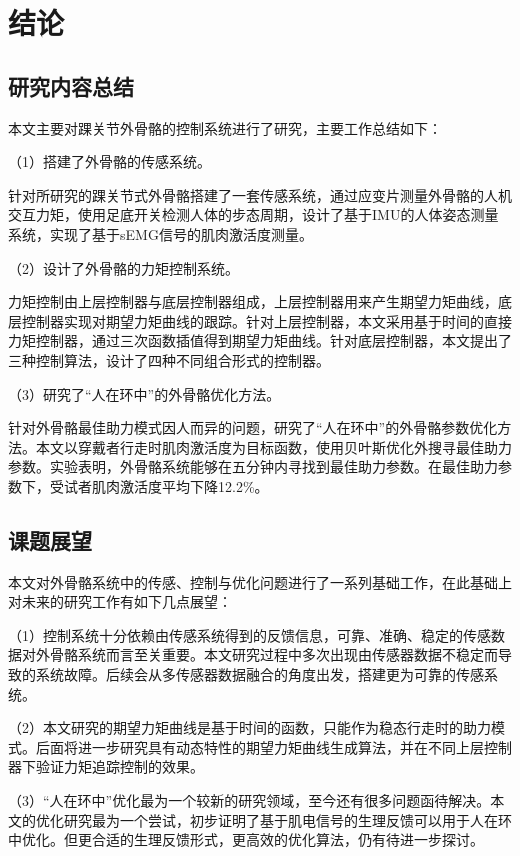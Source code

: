\chapter{结论}
\section{研究内容总结}

本文主要对踝关节外骨骼的控制系统进行了研究，主要工作总结如下：

（1）搭建了外骨骼的传感系统。

针对所研究的踝关节式外骨骼搭建了一套传感系统，通过应变片测量外骨骼的人机交互力矩，使用足底开关检测人体的步态周期，设计了基于IMU的人体姿态测量系统，实现了基于sEMG信号的肌肉激活度测量。

（2）设计了外骨骼的力矩控制系统。

力矩控制由上层控制器与底层控制器组成，上层控制器用来产生期望力矩曲线，底层控制器实现对期望力矩曲线的跟踪。针对上层控制器，本文采用基于时间的直接力矩控制器，通过三次函数插值得到期望力矩曲线。针对底层控制器，本文提出了三种控制算法，设计了四种不同组合形式的控制器。

（3）研究了“人在环中”的外骨骼优化方法。

针对外骨骼最佳助力模式因人而异的问题，研究了“人在环中”的外骨骼参数优化方法。本文以穿戴者行走时肌肉激活度为目标函数，使用贝叶斯优化外搜寻最佳助力参数。实验表明，外骨骼系统能够在五分钟内寻找到最佳助力参数。在最佳助力参数下，受试者肌肉激活度平均下降12.2\%。

\section{课题展望}

本文对外骨骼系统中的传感、控制与优化问题进行了一系列基础工作，在此基础上对未来的研究工作有如下几点展望：

（1）控制系统十分依赖由传感系统得到的反馈信息，可靠、准确、稳定的传感数据对外骨骼系统而言至关重要。本文研究过程中多次出现由传感器数据不稳定而导致的系统故障。后续会从多传感器数据融合的角度出发，搭建更为可靠的传感系统。

（2）本文研究的期望力矩曲线是基于时间的函数，只能作为稳态行走时的助力模式。后面将进一步研究具有动态特性的期望力矩曲线生成算法，并在不同上层控制器下验证力矩追踪控制的效果。

（3）“人在环中”优化最为一个较新的研究领域，至今还有很多问题函待解决。本文的优化研究最为一个尝试，初步证明了基于肌电信号的生理反馈可以用于人在环中优化。但更合适的生理反馈形式，更高效的优化算法，仍有待进一步探讨。